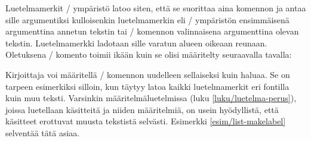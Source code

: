 Luetelmamerkit \-/ ympäristö latoo siten, että se
suorittaa aina komennon  ja antaa sille argumentiksi
kulloisenkin luetelmamerkin eli \-/ ympäristön
ensimmäisenä argumenttina annetun tekstin tai \-/ komennon
valinnaisena argumenttina olevan tekstin. Luetelmamerkki ladotaan sille
varatun alueen oikeaan reunaan. Oletuksena \-/
komento toimii ikään kuin se olisi määritelty seuraavalla tavalla:

\begin{koodilohkosis}
\renewcommand{\makelabel}[1]{\hfill #1}
\end{koodilohkosis}

Kirjoittaja voi määritellä \-/ komennon uudelleen
sellaiseksi kuin haluaa. Se on tarpeen esimerkiksi silloin, kun täytyy
latoa kaikki luetelmamerkit eri fontilla kuin muu teksti. Varsinkin
määritelmäluetelmissa (luku \ref{luku/luetelma-perus}), joissa
luetellaan käsitteitä ja niiden määritelmiä, on usein hyödyllistä, että
käsitteet erottuvat muusta tekstistä selvästi. Esimerkki
\ref{esim/list-makelabel} selventää tätä asiaa.

